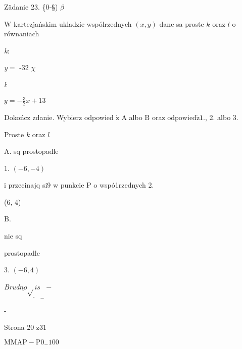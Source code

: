 \documentclass[a4paper,12pt]{article}
\begin{document}
Zädanie 23. \{0-\S) $\beta$

$\mathrm{W}$ kartezjańskim ukladzie wspólrzednych $(x,y)$ dane sa proste $k$ oraz $l$ o równaniach

{\it k}:

{\it y}$=$ -32 $\chi$

{\it l}:

$y=-\displaystyle \frac{3}{2}x+13$

Dokończ zdanie. Wybierz odpowied $\acute{\mathrm{z}}$ A albo $\mathrm{B}$ oraz $\mathrm{o}\mathrm{d}\mathrm{p}\mathrm{o}\mathrm{w}\mathrm{i}\mathrm{e}\mathrm{d}\acute{\mathrm{z}}1.$, 2. albo 3.

Proste $k$ oraz $l$

A. sq prostopadle

1. $(-6,-4)$

i przecinajq si9 w punkcie P o wspó1rzednych 2.

(6, 4)

B.

nie sq

prostopadle

3. $(-6,4)$

{\it Brud}$\underline{no}\underline{\sqrt{}is}_{-} -$

-

Strona 20 z31

$\mathrm{M}\mathrm{M}\mathrm{A}\mathrm{P}-\mathrm{P}0_{-}100$
\end{document}
